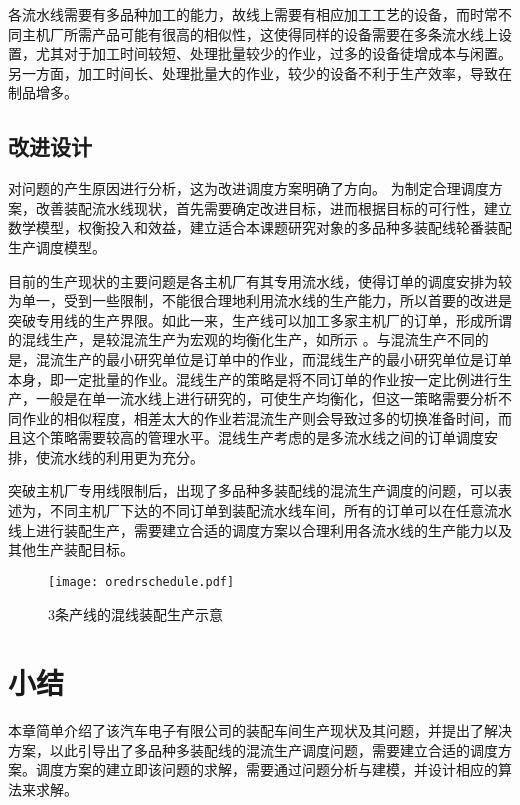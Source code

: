 各流水线需要有多品种加工的能力，故线上需要有相应加工工艺的设备，而时常不同主机厂所需产品可能有很高的相似性，这使得同样的设备需要在多条流水线上设置，尤其对于加工时间较短、处理批量较少的作业，过多的设备徒增成本与闲置。另一方面，加工时间长、处理批量大的作业，较少的设备不利于生产效率，导致在制品增多。

\subsection{改进设计}
对问题的产生原因进行分析，这为改进调度方案明确了方向。
为制定合理调度方案，改善装配流水线现状，首先需要确定改进目标，进而根据目标的可行性，建立数学模型，权衡投入和效益，建立适合本课题研究对象的多品种多装配线轮番装配生产调度模型。

目前的生产现状的主要问题是各主机厂有其专用流水线，使得订单的调度安排为较为单一，受到一些限制，不能很合理地利用流水线的生产能力，所以首要的改进是突破专用线的生产界限。如此一来，生产线可以加工多家主机厂的订单，形成所谓的混线生产，是较混流生产为宏观的均衡化生产，如所示
。与混流生产不同的是，混流生产的最小研究单位是订单中的作业，而混线生产的最小研究单位是订单本身，即一定批量的作业。混线生产的策略是将不同订单的作业按一定比例进行生产，一般是在单一流水线上进行研究的，可使生产均衡化，但这一策略需要分析不同作业的相似程度，相差太大的作业若混流生产则会导致过多的切换准备时间，而且这个策略需要较高的管理水平。混线生产考虑的是多流水线之间的订单调度安排，使流水线的利用更为充分。

突破主机厂专用线限制后，出现了多品种多装配线的混流生产调度的问题，可以表述为，不同主机厂下达的不同订单到装配流水线车间，所有的订单可以在任意流水线上进行装配生产，需要建立合适的调度方案以合理利用各流水线的生产能力以及其他生产装配目标。

\begin{figure}[h]
\centering
\texttt{[image: oredrschedule.pdf]}
\caption{$3$条产线的混线装配生产示意\label{fig:orderschedule}}
\end{figure}

\section{小结}
本章简单介绍了该汽车电子有限公司的装配车间生产现状及其问题，并提出了解决方案，以此引导出了多品种多装配线的混流生产调度问题，需要建立合适的调度方案。调度方案的建立即该问题的求解，需要通过问题分析与建模，并设计相应的算法来求解。